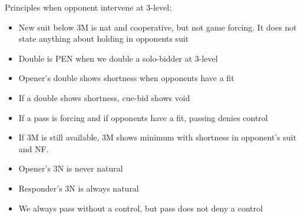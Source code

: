 \documentclass{article}
\renewcommand{\sp}{\ensuremath\spadesuit}
\newcommand{\he}{\ensuremath\heartsuit}
\newcommand{\di}{\ensuremath\diamondsuit}
\newcommand{\nt}{\relsize{-1}NT\relsize{1}}
\begin{document}
Principles when opponent intervene at 3-level:
\begin{itemize}
	\itemsep0em
	\item New suit below 3M is nat and cooperative, but not game forcing. It does not state anything about holding in opponents suit
	\item Double is PEN when we double a solo-bidder at 3-level
	\item Opener's double shows shortness when opponents have a fit
	\item If a double shows shortness, cue-bid shows void
	\item If a pass is forcing and if opponents have a fit, passing denies control
	\item If 3M is still available, 3M shows minimum with shortness in opponent's suit and NF.
	\item Opener's 3N is never natural
	\item Responder's 3N is always natural
	\item We always pass without a control, but pass does not deny a control
\end{itemize}

\\\\

\\\\
\end{document}
